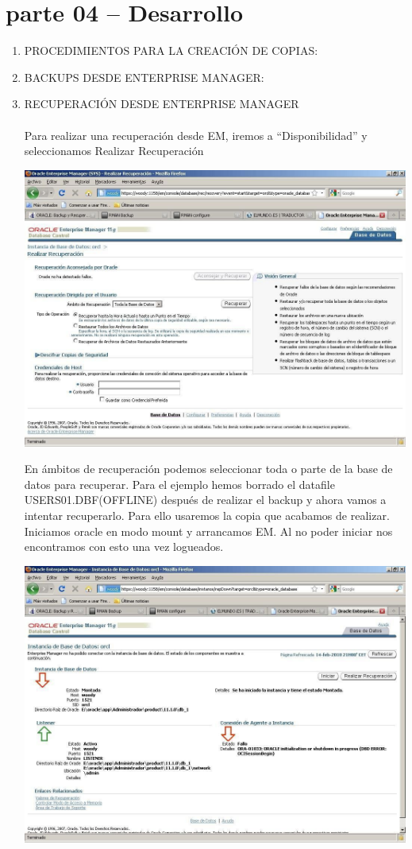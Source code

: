 \section{parte 04 – Desarrollo} 

\begin{enumerate}[1.]
	\item PROCEDIMIENTOS PARA LA CREACIÓN DE COPIAS:


	\item BACKUPS  DESDE  ENTERPRISE  MANAGER:
	

	\item RECUPERACIÓN  DESDE  ENTERPRISE  MANAGER
	\\\\Para realizar una recuperación desde EM, iremos a “Disponibilidad” y seleccionamos Realizar Recuperación
	\begin{center}
	\includegraphics[width=15cm]{./Imagenes/recu_1}  
	\end{center}	
	En ámbitos de recuperación podemos seleccionar toda o parte de la base de datos para recuperar.
Para  el  ejemplo  hemos  borrado  el  datafile  USERS01.DBF(OFFLINE)  después  de realizar el backup y ahora vamos a intentar recuperarlo. Para ello usaremos la copia que acabamos de realizar. Iniciamos oracle en modo mount y arrancamos EM. Al no poder iniciar nos encontramos con esto una vez logueados.
	\begin{center}
	\includegraphics[width=15cm]{./Imagenes/recu_2}  

\end{center}
\end{enumerate}
